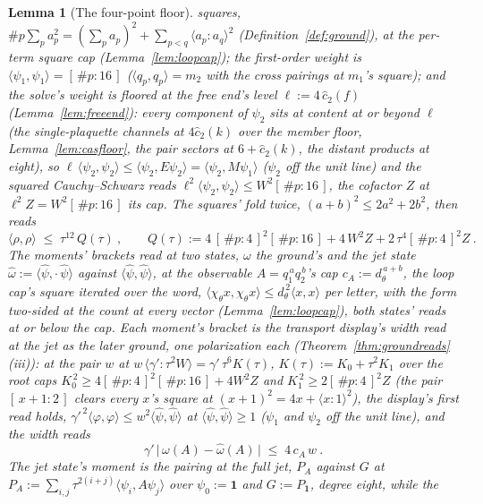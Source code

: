 \documentclass[11pt]{article}
\newtheorem{lemma}{Lemma}
\theoremstyle{definition}
\begin{document}
\begin{lemma}[The four-point floor]
squares, $\#p\sum_pa_p^2=(\sum_pa_p)^2+\sum_{p<q}\langle
a_p\!:\!a_q\rangle^2$ (Definition~\ref{def:ground}), at the
per-term square cap (Lemma~\ref{lem:loopcap}); the first-order
weight is $\langle\psi_1,\psi_1\rangle=[\,\#p:16\,]$
($\langle q_p,q_p\rangle=m_2$ with the cross pairings at $m_1$'s
square); and the solve's weight is floored at the free end's level
$\ell:=4\,\hat c_2(f)$ (Lemma~\ref{lem:freeend}): every component
of $\psi_2$ sits at content at or beyond $\ell$ (the
single-plaquette channels at $4\hat c_2(k)$ over the member floor,
Lemma~\ref{lem:casfloor}, the pair sectors at $6+\hat c_2(k)$, the
distant products at eight), so
$\ell\,\langle\psi_2,\psi_2\rangle\le\langle\psi_2,E\psi_2\rangle
=\langle\psi_2,M\psi_1\rangle$ ($\psi_2$ off the unit line) and the
squared Cauchy--Schwarz reads
$\ell^2\langle\psi_2,\psi_2\rangle\le W^2[\,\#p:16\,]$, the
cofactor $Z$ at $\ell^2Z=W^2[\,\#p:16\,]$ its cap. The squares'
fold twice, $(a+b)^2\le2a^2+2b^2$, then reads
\[
\langle\rho,\rho\rangle\;\le\;\tau^{12}\,Q(\tau)\ ,\qquad
Q(\tau):=4\,[\,\#p:4\,]^2[\,\#p:16\,]+4\,W^2Z
+2\,\tau^4[\,\#p:4\,]^2Z\ .
\]
The moments' brackets read at two states, $\omega$ the ground's
and the \emph{jet state}
$\hat\omega:=\langle\hat\psi,\cdot\,\hat\psi\rangle$ against
$\langle\hat\psi,\hat\psi\rangle$, at the observable
$A=q_1^{\,a}q_2^{\,b}$'s \emph{cap} $c_A:=d_\theta^{\,a+b}$, the loop
cap's square iterated over the word,
$\langle\chi_\theta x,\chi_\theta x\rangle\le d_\theta^{\,2}
\langle x,x\rangle$ per letter, with the form two-sided at the
count at every vector (Lemma~\ref{lem:loopcap}), both states' reads
at or below the cap. Each moment's bracket is the transport
display's width read at the jet as the later ground, one
polarization each (Theorem~\ref{thm:groundreads}(iii)): at the
pair $w$ at $w\,\langle\gamma'\!:\!\tau^2W\rangle=\gamma'\,\tau^6K(\tau)$,
$K(\tau):=K_0+\tau^2K_1$ over the \emph{root caps}
$K_0^{\,2}\ge4[\,\#p:4\,]^2[\,\#p:16\,]+4W^2Z$ and
$K_1^{\,2}\ge2[\,\#p:4\,]^2Z$ (the pair $[\,x+1:2\,]$ clears every
$x$'s square at $(x+1)^2=4x+\langle x\!:\!1\rangle^2$), the display's
first read holds,
$\gamma'^{\,2}\langle\varphi,\varphi\rangle
\le w^2\langle\hat\psi,\hat\psi\rangle$ at
$\langle\hat\psi,\hat\psi\rangle\ge1$ ($\psi_1$ and $\psi_2$ off the
unit line), and the width reads
\[
\gamma'\,\big|\,\omega(A)-\hat\omega(A)\,\big|\;\le\;4\,c_A\,w\ .
\]
The jet state's moment is the pairing at the full jet, $P_A$
against $G$ at
$P_A:=\sum_{i,j}\tau^{2(i+j)}\langle\psi_i,A\psi_j\rangle$ over
$\psi_0:=\mathbf1$ and $G:=P_{\mathbf1}$, degree eight, while the

\end{lemma}
\end{document}
